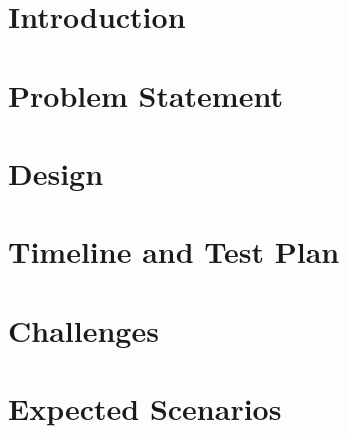 \documentclass[a4paper,10pt,twoside]{report}
\author{\me}
\begin{document}


\normalsize

\tableofcontents

\chapter{Introduction}\label{chapter:Introduction}
\setcounter{page}{0}


\chapter{Problem Statement}\label{chapter:Problem Statement}


\chapter{Design}\label{chapter:Design}


\chapter{Timeline and Test Plan}\label{chapter:Test Plan}


\chapter{Challenges}\label{chapter:Challenges}


\chapter{Expected Scenarios}\label{chapter:Expected Scenarios}


%
%
\end{document}
